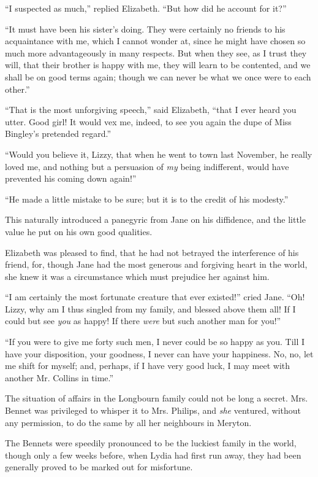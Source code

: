 “I suspected as much,” replied Elizabeth. “But how
did he account for it?”

“It must have been his sister’s doing. They were
certainly no friends to his acquaintance with me, which
I cannot wonder at, since he might have chosen so much
more advantageously in many respects. But when they
see, as I trust they will, that their brother is happy with
me, they will learn to be contented, and we shall be on
good terms again; though we can never be what we once
were to each other.”

“That is the most unforgiving speech,” said Elizabeth,
“that I ever heard you utter. Good girl! It would vex
me, indeed, to see you again the dupe of Miss Bingley’s
pretended regard.”

“Would you believe it, Lizzy, that when he went to
town last November, he really loved me, and nothing but
a persuasion of \textit{my} being indifferent, would have prevented
his coming down again!”

“He made a little mistake to be sure; but it is to
the credit of his modesty.”

This naturally introduced a panegyric from Jane on
his diffidence, and the little value he put on his own good
qualities.

Elizabeth was pleased to find, that he had not betrayed
the interference of his friend, for, though Jane had the
most generous and forgiving heart in the world, she knew it
was a circumstance which must prejudice her against him.

“I am certainly the most fortunate creature that ever
existed!” cried Jane. “Oh! Lizzy, why am I thus
singled from my family, and blessed above them all!
If I could but see \textit{you} as happy! If there \textit{were} but such
another man for you!”

“If you were to give me forty such men, I never could
be so happy as you. Till I have your disposition, your
goodness, I never can have your happiness. No, no, let
me shift for myself; and, perhaps, if I have very good
luck, I may meet with another Mr. Collins in time.”

The situation of affairs in the Longbourn family could
not be long a secret. Mrs. Bennet was privileged to whisper
it to Mrs. Philips, and \textit{she} ventured, without any permission,
to do the same by all her neighbours in Meryton.

The Bennets were speedily pronounced to be the luckiest
family in the world, though only a few weeks before, when
Lydia had first run away, they had been generally proved
to be marked out for misfortune.

